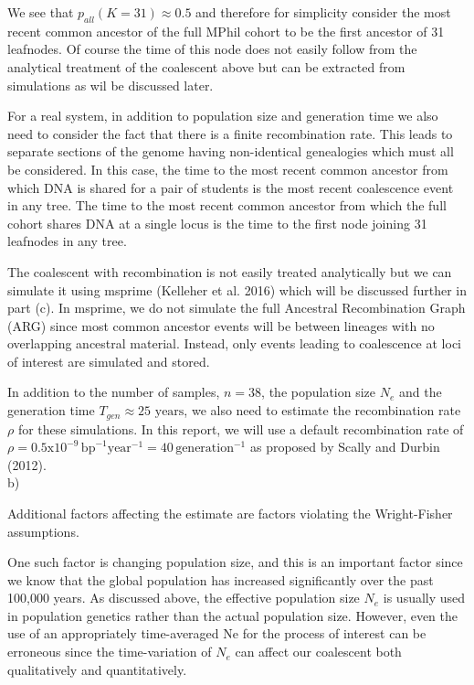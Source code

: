 \documentclass{article}
\begin{document}
We see that $p_{all}(K = 31) \approx 0.5$ and therefore for simplicity consider the most recent common ancestor of the full MPhil cohort to be the first ancestor of 31 leafnodes.
Of course the time of this node does not easily follow from the analytical treatment of the coalescent above but can be extracted from simulations as wil be discussed later.

For a real system, in addition to population size and generation time we also need to consider the fact that there is a finite recombination rate. This leads to separate sections of the genome having non-identical genealogies which must all be considered. In this case, the time to the most recent common ancestor from which DNA is shared for a pair of students is the most recent coalescence event in any tree. The time to the most recent common ancestor from which the full cohort shares DNA at a single locus is the time to the first node joining 31 leafnodes in any tree.

The coalescent with recombination is not easily treated analytically but we can simulate it using msprime (Kelleher et al. 2016) which will be discussed further in part (c). In msprime, we do not simulate the full Ancestral Recombination Graph (ARG) since most common ancestor events will be between lineages with no overlapping ancestral material. Instead, only events leading to coalescence at loci of interest are simulated and stored.

In addition to the number of samples, $n=38$, the population size $N_e$ and the generation time $T_{gen} \approx 25 \text{ years}$, we also need to estimate the recombination rate $\rho$ for these simulations. 
In this report, we will use a default recombination rate of $\rho = 0.5 \text{x} 10^{-9} \, \text{bp}^{-1} \text{year}^{-1} = 40 \, \text{generation}^{-1}$ as proposed by Scally and Durbin (2012).
\\


b) %

Additional factors affecting the estimate are factors violating the Wright-Fisher assumptions.

One such factor is changing population size, and this is an important factor since we know that the global population has increased significantly over the past 100,000 years. As discussed above, the effective population size $N_e$ is usually used in population genetics rather than the actual population size. However, even the use of an appropriately time-averaged Ne for the process of interest  can be erroneous since the time-variation of $N_e$ can affect our coalescent both qualitatively and quantitatively.
\end{document}
